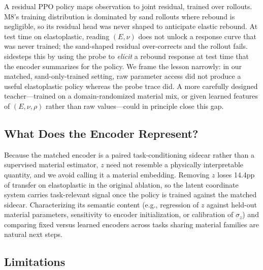A residual PPO policy maps observation to joint residual, trained over rollouts. M8's training distribution is dominated by sand rollouts where rebound is negligible, so its residual head was never shaped to anticipate elastic rebound. At test time on elastoplastic, reading $(E, \nu)$ does not unlock a response curve that was never trained; the sand-shaped residual over-corrects and the rollout fails. \PTA{} sidesteps this by using the probe to \emph{elicit} a rebound response at test time that the encoder summarizes for the policy. We frame the lesson narrowly: in our matched, sand-only-trained setting, raw parameter access did not produce a useful elastoplastic policy whereas the probe trace did. A more carefully designed teacher---trained on a domain-randomized material mix, or given learned features of $(E,\nu,\rho)$ rather than raw values---could in principle close this gap.

\subsection{What Does the Encoder Represent?}

Because the matched encoder is a paired task-conditioning sidecar rather than a supervised material estimator, $z$ need not resemble a physically interpretable quantity, and we avoid calling it a material embedding. Removing $z$ loses 14.4pp of transfer on elastoplastic in the original ablation, so the latent coordinate system carries task-relevant signal once the policy is trained against the matched sidecar. Characterizing its semantic content (e.g., regression of $z$ against held-out material parameters, sensitivity to encoder initialization, or calibration of $\sigma_z$) and comparing fixed versus learned encoders across tasks sharing material families are natural next steps.

\subsection{Limitations}

